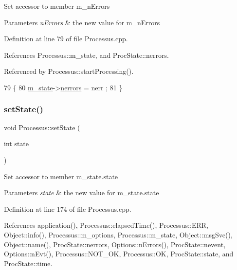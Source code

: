 Set accessor to member m\+\_\+n\+Errors 
\begin{DoxyParams}{Parameters}
{\em n\+Errors} & the new value for m\+\_\+n\+Errors \\
\hline
\end{DoxyParams}


Definition at line 79 of file Processus.\+cpp.



References Processus\+::m\+\_\+state, and Proc\+State\+::nerrors.



Referenced by Processus\+::start\+Processing().


\begin{DoxyCode}
79                                              \{
80   \hyperlink{classProcessus_ab3539eee42891ceae0baf4395ae7fb61}{m\_state}->\hyperlink{structProcState_a51a0f54ba62b07e07ac8518c5f32828d}{nerrors} = nerr ;
81 \}
\end{DoxyCode}
\mbox{\label{classProcessus_ad38cde0f1bcefa00b068e7947b8af927}} 
\subsubsection{\texorpdfstring{set\+State()}{setState()}}
{\footnotesize\ttfamily void Processus\+::set\+State (\begin{DoxyParamCaption}\item[{int}]{state }\end{DoxyParamCaption})\hspace{0.3cm}{\ttfamily [inherited]}}

Set accessor to member m\+\_\+state.\+state 
\begin{DoxyParams}{Parameters}
{\em state} & the new value for m\+\_\+state.\+state \\
\hline
\end{DoxyParams}


Definition at line 174 of file Processus.\+cpp.



References application(), Processus\+::elapsed\+Time(), Processus\+::\+E\+RR, Object\+::info(), Processus\+::m\+\_\+options, Processus\+::m\+\_\+state, Object\+::msg\+Svc(), Object\+::name(), Proc\+State\+::nerrors, Options\+::n\+Errors(), Proc\+State\+::nevent, Options\+::n\+Evt(), Processus\+::\+N\+O\+T\+\_\+\+OK, Processus\+::\+OK, Proc\+State\+::state, and Proc\+State\+::time.



